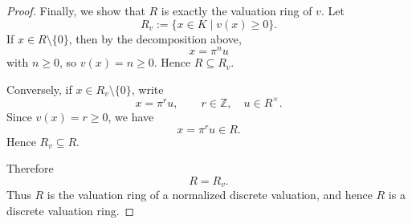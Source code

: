 \begin{proof}
    Finally, we show that \(R\) is exactly the valuation ring of \(v\). Let
    \[
        R_v:=\{x\in K\mid v(x)\geq 0\}.
    \]
    If \(x\in R\setminus\{0\}\), then by the decomposition above,
    \[
        x=\pi^n u
    \]
    with \(n\geq 0\), so \(v(x)=n\geq 0\). Hence \(R\subseteq R_v\).

    Conversely, if \(x\in R_v\setminus\{0\}\), write
    \[
        x=\pi^r u,
        \qquad r\in\mathbb{Z},\quad u\in R^\times.
    \]
    Since \(v(x)=r\geq 0\), we have
    \[
        x=\pi^r u\in R.
    \]
    Hence \(R_v\subseteq R\).

    Therefore
    \[
        R=R_v.
    \]
    Thus \(R\) is the valuation ring of a normalized discrete valuation, and hence \(R\)
    is a discrete valuation ring.
\end{proof}

